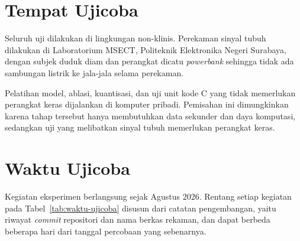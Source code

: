 \section{Tempat Ujicoba}

Seluruh uji dilakukan di lingkungan non-klinis. Perekaman sinyal tubuh dilakukan di Laboratorium MSECT, Politeknik Elektronika Negeri Surabaya, dengan subjek duduk diam dan perangkat dicatu \textit{powerbank} sehingga tidak ada sambungan listrik ke jala-jala selama perekaman.

Pelatihan model, ablasi, kuantisasi, dan uji unit kode C yang tidak memerlukan perangkat keras dijalankan di komputer pribadi. Pemisahan ini dimungkinkan karena tahap tersebut hanya membutuhkan data sekunder dan daya komputasi, sedangkan uji yang melibatkan sinyal tubuh memerlukan perangkat keras.


\section{Waktu Ujicoba}

Kegiatan eksperimen berlangsung sejak Agustus 2026. Rentang setiap kegiatan pada Tabel~\ref{tab:waktu-ujicoba} disusun dari catatan pengembangan, yaitu riwayat \textit{commit} repositori dan nama berkas rekaman, dan dapat berbeda beberapa hari dari tanggal percobaan yang sebenarnya.

